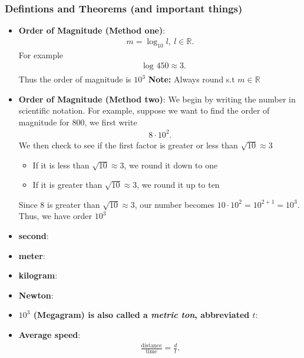 \documentclass{report}
\begin{document}
    \subsubsection{Defintions and Theorems (and important things)}
    \begin{itemize}
        \item \textbf{Order of Magnitude (Method one)}:
            \begin{align*}
                m = \log_{10}{l},\ l \in \mathbb{R}
            .\end{align*}
            For example
            \begin{align*}
                &\log_{}{450} \approx 3
            .\end{align*}
            Thus the order of magnitude is $10^{3}$
            \bigbreak \noindent 
            \textbf{Note:} Always round s.t $m \in \mathbb{R}$ 
        \item \textbf{Order of Magnitude (Method two)}: We begin by writing the number in scientific notation. For example, suppose we want to find the order of magnitude for $800$, we first write 
            \begin{align*}
                8 \cdot 10^{2}
            .\end{align*}
            We then check to see if the first factor is greater or less than $\sqrt{10} \approx 3$
            \begin{itemize}
                \item If it is less than $\sqrt{10} \approx  3$, we round it down to one
                \item If it is greater than $\sqrt{10} \approx  3$, we round it up to ten
            \end{itemize}
            Since 8 is greater than $\sqrt{10} \approx  3$, our number becomes $10 \cdot 10^{2} = 10^{2+1} = 10^{3}$. Thus, we have order $10^{3}$
        \item \textbf{second}:
        \item \textbf{meter}:
        \item \textbf{kilogram}:
        \item \textbf{Newton}:
        \item \textbf{$10^{3}$ (Megagram) is also called a \textit{metric ton}, abbreviated $t$}:
        \item \textbf{Average speed}:
            \begin{align*}
                \frac{\text{distance}}{\text{time}} = \frac{d}{t}
            .\end{align*}

\end{itemize}
\end{document}
